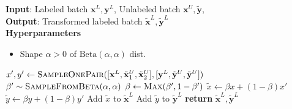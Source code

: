 \begin{algorithm}[!h]
\caption{MixMatchAug : Transformation of Labeled Set}
\label{alg:mixmatch}
\textbf{Input}:
Labeled batch $\mathbf{x}^L, \mathbf{y}^L$, 
Unlabeled batch $\mathbf{x}^U, \tilde{\mathbf{y}}$, 
\\
\textbf{Output}: 
Transformed labeled batch $\mathbf{\tilde{x}}^L, \mathbf{\tilde{y}}^L$
\\
\textbf{Hyperparameters}
\begin{itemize}
	\item Shape $\alpha{>}0$ of $\text{Beta}(\alpha, \alpha)$ dist.
\end{itemize}
\begin{algorithmic}[1] %
\STATE $x', y' \gets \textsc{SampleOnePair}([\mathbf{x}^L, \tilde{\mathbf{x}}^U_1, \tilde{\mathbf{x}}^U_2],
     [\mathbf{y}^L, \tilde{\mathbf{y}}^U, \tilde{\mathbf{y}}^U])$
\STATE $\beta' \sim \textsc{SampleFromBeta}(\alpha, \alpha)$
\STATE $\beta \gets \textsc{Max}(\beta', 1-\beta')$ 
\STATE $\tilde{x} \gets \beta x + (1-\beta) x'$
\STATE $\tilde{y} \gets \beta y + (1-\beta) y'$
\STATE Add $\tilde{x}$ to $\tilde{\mathbf{x}}^L$
\STATE Add $\tilde{y}$ to $\tilde{\mathbf{y}}^L$
\ENDFOR
\STATE \textbf{return} $\tilde{\mathbf{x}}^L, \tilde{\mathbf{y}}^L$
\end{algorithmic}
\end{algorithm}
